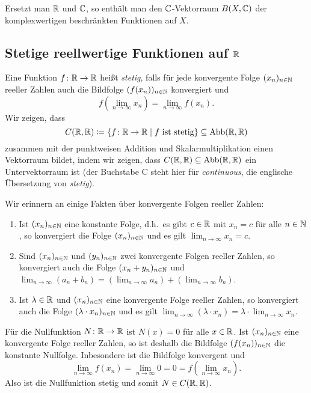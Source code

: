\begin{bem}
 Ersetzt man $\mathbb{R}$ und $\mathbb{C}$, so enthält man den $\mathbb{C}$-Vektorraum $B(X,\mathbb{C})$ der komplexwertigen beschränkten Funktionen auf $X$.
\end{bem}




\subsection{Stetige reellwertige Funktionen auf \texorpdfstring{$\mathbb{R}$}{R}}
Eine Funktion $f \colon \mathbb{R} \to \mathbb{R}$ heißt \emph{stetig}, falls für jede konvergente Folge $(x_n)_{n \in \mathbb{N}}$ reeller Zahlen auch die Bildfolge $(f(x_n))_{n \in \mathbb{N}}$ konvergiert und
\[
 f\left( \lim_{n \to \infty} x_n \right)
 = \lim_{n \to \infty} f(x_n).
\]
Wir zeigen, dass
\[
 C(\mathbb{R},\mathbb{R})
 \coloneqq \{f \colon \mathbb{R} \to \mathbb{R} \mid \text{$f$ ist stetig}\}
 \subseteq \mathrm{Abb}(\mathbb{R}, \mathbb{R})
\]
zusammen mit der punktweisen Addition und Skalarmultiplikation einen Vektorraum bildet, indem wir zeigen, dass $C(\mathbb{R}, \mathbb{R}) \subseteq \mathrm{Abb}(\mathbb{R}, \mathbb{R})$ ein Untervektorraum ist (der Buchstabe C steht hier für \emph{continuous}, die englische Übersetzung von \emph{stetig}).


\begin{bem}
 Wir erinnern an einige Fakten über konvergente Folgen reeller Zahlen:
 \begin{enumerate}[label=\roman*)]
  \item
   Ist $(x_n)_{n \in \mathbb{N}}$ eine konstante Folge, d.h.\ es gibt $c \in \mathbb{R}$ mit $x_n = c$ für alle $n \in \mathbb{N}$, so konvergiert die Folge $(x_n)_{n \in \mathbb{N}}$ und es gilt $\lim_{n \to \infty} x_n = c$.
  \item
   Sind $(x_n)_{n \in \mathbb{N}}$ und $(y_n)_{n \in \mathbb{N}}$ zwei konvergente Folgen reeller Zahlen, so konvergiert auch die Folge $(x_n + y_n)_{n \in \mathbb{N}}$ und $\lim_{n \to \infty} (a_n+b_n) = (\lim_{n \to \infty} a_n) + (\lim_{n \to \infty} b_n)$.
  \item
   Ist $\lambda \in \mathbb{R}$ und $(x_n)_{n \in \mathbb{N}}$ eine konvergente Folge reeller Zahlen, so konvergiert auch die Folge $(\lambda \cdot x_n)_{n \in \mathbb{N}}$ und es gilt $\lim_{n \to \infty} (\lambda \cdot x_n) = \lambda \cdot \lim_{n \to \infty} x_n$.
 \end{enumerate}
\end{bem}


Für die Nullfunktion $N \colon \mathbb{R} \to \mathbb{R}$ ist $N(x) = 0$ für alle $x \in \mathbb{R}$. Ist $(x_n)_{n \in \mathbb{N}}$ eine konvergente Folge reeller Zahlen, so ist deshalb die Bildfolge $(f(x_n))_{n \in \mathbb{N}}$ die konstante Nullfolge. Inbesondere ist die Bildfolge konvergent und
\[
 \lim_{n \to \infty} f(x_n)
 = \lim_{n \to \infty} 0
 = 0
 = f\left( \lim_{n \to \infty} x_n \right).
\]
Also ist die Nullfunktion stetig und somit $N \in C(\mathbb{R},\mathbb{R})$.

